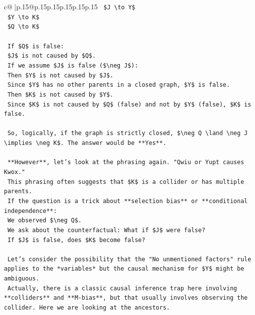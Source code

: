 \documentclass{article}
\begin{document}
{\begin{supertabular}{c@{$\;$}|p{.15\linewidth}@{}p{.15\linewidth}p{.15\linewidth}p{.15\linewidth}p{.15\linewidth}p{.15\linewidth}}
{{{\texttt{        \$J \textbackslash{}to Y\$} \\
\texttt{        \$Y \textbackslash{}to K\$} \\
\texttt{        \$Q \textbackslash{}to K\$} \\
\\ 
\texttt{        If \$Q\$ is false:} \\
\texttt{        \$J\$ is not caused by \$Q\$.} \\
\texttt{        If we assume \$J\$ is false (\$\textbackslash{}neg J\$):} \\
\texttt{        Then \$Y\$ is not caused by \$J\$.} \\
\texttt{        Since \$Y\$ has no other parents in a closed graph, \$Y\$ is false.} \\
\texttt{        Then \$K\$ is not caused by \$Y\$.} \\
\texttt{        Since \$K\$ is not caused by \$Q\$ (false) and not by \$Y\$ (false), \$K\$ is false.} \\
\\ 
\texttt{        So, logically, if the graph is strictly closed, \$\textbackslash{}neg Q \textbackslash{}land \textbackslash{}neg J \textbackslash{}implies \textbackslash{}neg K\$. The answer would be **Yes**.} \\
\\ 
\texttt{        **However**, let's look at the phrasing again. "Qwiu or Yupt causes Kwox."} \\
\texttt{        This phrasing often suggests that \$K\$ is a collider or has multiple parents.} \\
\texttt{        If the question is a trick about **selection bias** or **conditional independence**:} \\
\texttt{        We observed \$\textbackslash{}neg Q\$.} \\
\texttt{        We ask about the counterfactual: What if \$J\$ were false?} \\
\texttt{        If \$J\$ is false, does \$K\$ become false?} \\
\\ 
\texttt{        Let's consider the possibility that the "No unmentioned factors" rule applies to the *variables* but the causal mechanism for \$Y\$ might be ambiguous.} \\
\texttt{        Actually, there is a classic causal inference trap here involving **colliders** and **M{-}bias**, but that usually involves observing the collider. Here we are looking at the ancestors.} \\
}}}
\end{supertabular}}
\end{document}

